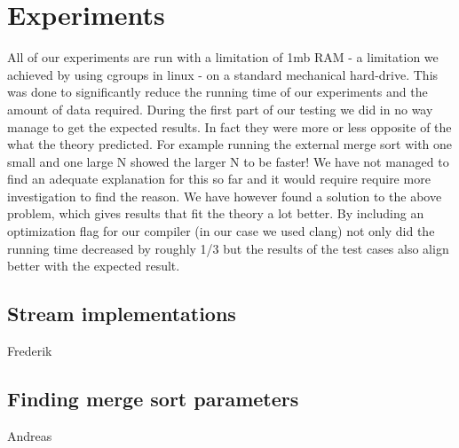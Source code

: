 \section{Experiments}

All of our experiments are run with a limitation of 1mb RAM - a limitation we achieved by using cgroups in linux - on a standard mechanical hard-drive. This was done to significantly reduce the running time of our experiments and the amount of data required. 
During the first part of our testing we did in no way manage to get the expected results. In fact they were more or less opposite of the what the theory predicted. For example running the external merge sort with one small and one large N showed the larger N to be faster! We have not managed to find an adequate explanation for this so far and it would require require more investigation to find the reason.
We have however found a solution to the above problem, which gives results that fit the theory a lot better. By including an optimization flag for our compiler (in our case we used clang) not only did the running time decreased by roughly 1/3 but the results of the test cases also align better with the expected result. 

\subsection{Stream implementations}
Frederik

\subsection{ Finding merge sort parameters}
Andreas

